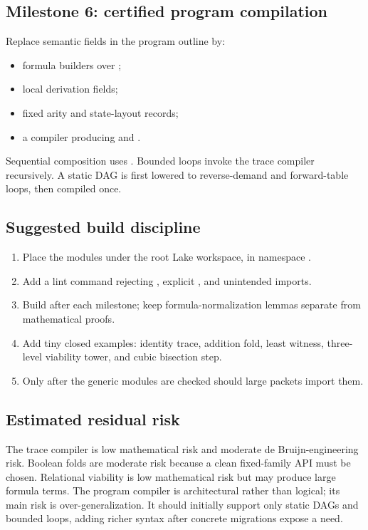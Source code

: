 \subsection{Milestone 6: certified program compilation}

Replace semantic  fields in the program outline by:
\begin{itemize}
\item formula builders over ;
\item local derivation fields;
\item fixed arity and state-layout records;
\item a compiler producing  and .
\end{itemize}
Sequential composition uses .  Bounded loops invoke the trace
compiler recursively.  A static DAG is first lowered to reverse-demand and
forward-table loops, then compiled once.

\subsection{Suggested build discipline}

\begin{enumerate}
\item Place the modules under the root Lake workspace, in namespace
\allowbreak{}.
\item Add a lint command rejecting , explicit , and
unintended imports.
\item Build after each milestone; keep formula-normalization lemmas separate
from mathematical proofs.
\item Add tiny closed examples: identity trace, addition fold, least witness,
three-level viability tower, and cubic bisection step.
\item Only after the generic modules are checked should large packets import
them.
\end{enumerate}

\subsection{Estimated residual risk}

The trace compiler is low mathematical risk and moderate de Bruijn-engineering
risk.  Boolean folds are moderate risk because a clean fixed-family API must be
chosen.  Relational viability is low mathematical risk but may produce large
formula terms.  The program compiler is architectural rather than logical;
its main risk is over-generalization.  It should initially support only static
DAGs and bounded loops, adding richer syntax after concrete migrations expose
a need.
